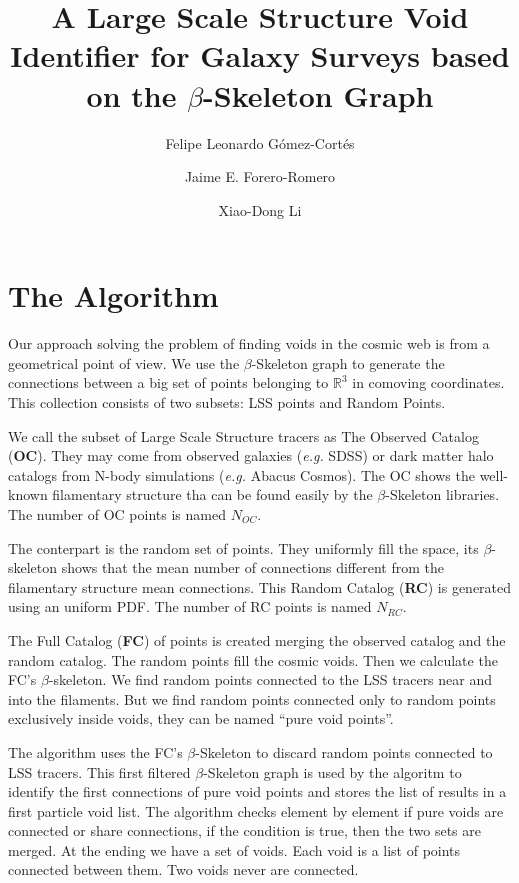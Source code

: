\documentclass[preprint]{aastex62}
\begin{document}
\title{A Large Scale Structure Void Identifier for Galaxy Surveys based on the $\beta$-Skeleton Graph}


\author{Felipe Leonardo Gómez-Cortés}

\author{Jaime E. Forero-Romero}

\author{Xiao-Dong Li}

\section{The Algorithm}

Our approach solving the problem of finding voids in the cosmic web is from
a geometrical point of view. We use the $\beta$-Skeleton graph to generate
the connections between a big set of points belonging to $\mathbb{R}^3$
in comoving coordinates. This collection consists of two subsets: LSS points
and Random Points.

We call the subset of Large Scale Structure tracers as The Observed Catalog
(\textbf{OC}). They may come from observed galaxies (\textit{e.g.} SDSS)
or dark matter halo catalogs from N-body simulations (\textit{e.g.} Abacus
Cosmos). The OC shows the well-known filamentary structure tha can be found
easily by the $\beta$-Skeleton libraries. The number of OC points is named
$N_{OC}$.

The conterpart is the random set of points. They uniformly fill the space,
its $\beta$-skeleton shows that the mean number of connections different
from the filamentary structure mean connections. This Random Catalog
(\textbf{RC}) is generated using an uniform PDF. The number of RC points
is named $N_{RC}$.

The Full Catalog (\textbf{FC}) of points is created merging the observed
catalog and the random catalog. The random points fill the cosmic voids.
Then we calculate the FC's $\beta$-skeleton. We find random points connected
to the LSS tracers near and into the filaments. But we find random points
connected only to random points exclusively inside voids, they can be
named ``pure void points''.

The algorithm uses the FC's $\beta$-Skeleton to discard random points
connected to LSS tracers. This first filtered $\beta$-Skeleton graph is
used by the algoritm to identify the first connections of pure void points
and stores the list of results in a first particle void list.
The algorithm checks element by element if pure voids are connected or
share connections, if the condition is true, then the two sets are merged.
At the ending we have a set of voids. Each void is a list of points
connected between them. Two voids never are connected.
\end{document}
